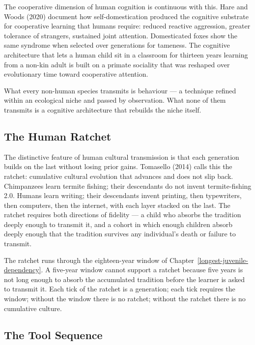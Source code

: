 \documentclass[12pt,letterpaper]{article}
\begin{document}
The cooperative dimension of human cognition is continuous with this.
Hare and Woods (2020) document how self-domestication produced the
cognitive substrate for cooperative learning that humans require:
reduced reactive aggression, greater tolerance of strangers, sustained
joint attention. Domesticated foxes show the same syndrome when
selected over generations for tameness. The cognitive architecture
that lets a human child sit in a classroom for thirteen years
learning from a non-kin adult is built on a primate sociality that
was reshaped over evolutionary time toward cooperative attention.

What every non-human species transmits is behaviour --- a technique
refined within an ecological niche and passed by observation. What
none of them transmits is a cognitive architecture that rebuilds the
niche itself.

\subsection{The Human Ratchet}\label{the-human-ratchet}

The distinctive feature of human cultural transmission is that each
generation builds on the last without losing prior gains. Tomasello
(2014) calls this the ratchet: cumulative cultural evolution that
advances and does not slip back. Chimpanzees learn termite fishing;
their descendants do not invent termite-fishing 2.0. Humans learn
writing; their descendants invent printing, then typewriters, then
computers, then the internet, with each layer stacked on the last.
The ratchet requires both directions of fidelity --- a child who
absorbs the tradition deeply enough to transmit it, and a cohort in
which enough children absorb deeply enough that the tradition
survives any individual's death or failure to transmit.

The ratchet runs through the eighteen-year window of
Chapter~\ref{longest-juvenile-dependency}. A five-year window cannot
support a ratchet because five years is not long enough to absorb
the accumulated tradition before the learner is asked to transmit it.
Each tick of the ratchet is a generation; each tick requires the
window; without the window there is no ratchet; without the ratchet
there is no cumulative culture.

\subsection{The Tool Sequence}\label{the-tool-sequence}
\end{document}
